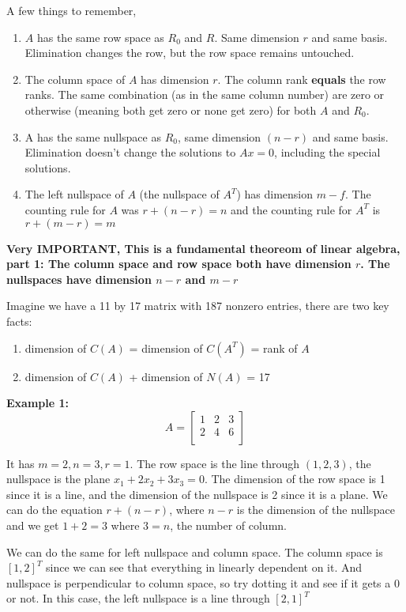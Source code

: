 A few things to remember,
\begin{enumerate}
    \item \(A\) has the same row space as \(R_0\) and \(R\). Same dimension \(r\) and same basis. Elimination changes the row, but the row space remains untouched. 
    \item The column space of \(A\) has dimension \(r\). The column rank \textbf{equals} the row ranks. The same combination (as in the same column number) are zero or otherwise (meaning both get zero or none get zero) for both \(A\) and \(R_0\).
    \item A has the same nullspace as \(R_0\), same dimension \((n - r)\) and same basis. Elimination doesn't change the solutions to \(Ax = 0\), including the special solutions. 
    \item The left nullspace of \(A\) (the nullspace of \(A^T\)) has dimension \(m-f\). The counting rule for \(A\) was \(r + (n - r) = n\) and the counting rule for \(A^T\) is \(r + (m - r) = m\)        
\end{enumerate}

\textbf{Very IMPORTANT, This is a fundamental theoreom of linear algebra, part 1: The column space and row space both have dimension \(r\). The nullspaces have dimension \(n - r\) and \(m - r\)}

Imagine we have a 11 by 17 matrix with 187 nonzero entries, there are two key facts:
\begin{enumerate}
    \item dimension of \(C(A)\) = dimension of \(C(A^T)\) = rank of \(A\)
    \item dimension of \(C(A)\) + dimension of \(N(A)\) = 17
\end{enumerate}

\textbf{Example 1:}
\[
    A = 
    \begin{bmatrix}
        1 & 2 & 3  \\
        2 & 4 & 6  \\
    \end{bmatrix}
\] 

It has \(m = 2, n = 3, r = 1\). The row space is the line through \((1, 2, 3)\), the nullspace is the plane \(x_1 + 2x_2 + 3x_3 = 0\). The dimension of the row space is 1 since it is a line, and the dimension of the nullspace is 2 since it is a plane. We can do the equation \(r + (n - r)\), where \(n - r\) is the dimension of the nullspace and we get \(1 + 2 = 3\) where \(3 = n\), the number of column. 

We can do the same for left nullspace and column space. The column space is \([1, 2]^T\) since we can see that everything in linearly dependent on it. And nullspace is perpendicular to column space, so try dotting it and see if it gets a 0 or not. In this case, the left nullspace is a line through \([2, 1]^T\)

